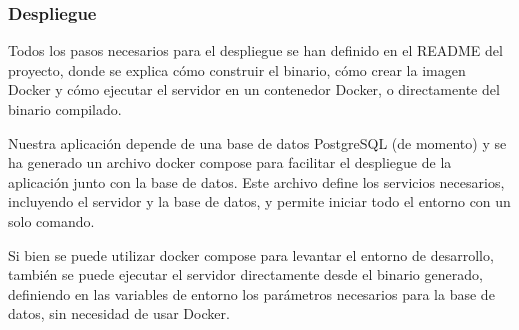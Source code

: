 \subsubsection{Despliegue}

Todos los pasos necesarios para el despliegue se han definido en el README del proyecto, donde se explica cómo construir el binario, cómo crear la imagen Docker y cómo ejecutar el servidor en un contenedor Docker, o directamente del binario compilado.

Nuestra aplicación depende de una base de datos PostgreSQL (de momento) y se ha generado un archivo docker compose para facilitar el despliegue de la aplicación junto con la base de datos. Este archivo define los servicios necesarios, incluyendo el servidor y la base de datos, y permite iniciar todo el entorno con un solo comando.

Si bien se puede utilizar docker compose para levantar el entorno de desarrollo, también se puede ejecutar el servidor directamente desde el binario generado, definiendo en las variables de entorno los parámetros necesarios para la base de datos, sin necesidad de usar Docker.
